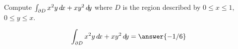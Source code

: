 \documentclass{ximera}
\author{David Guichard \and Neal Koblitz \and H. Jerome Keisler \and Albert Scheller \and Barry Balof \and Mike Wills \and Matthew Carr}
\begin{document}
\begin{exercise}




Compute $\int_{\partial D}x^2 y\mathop{}\!d\! x+xy^2 \mathop{}\!d\! y$ where $D$ is the region described by $0\le x\le 1$, $0\le y\le x$. 
 

\begin{prompt}
\[
\int_{\partial D}x^2 y\d x+xy^2 \d y=\answer{-1/6}
\]
\end{prompt}

\end{exercise}
\end{document}
